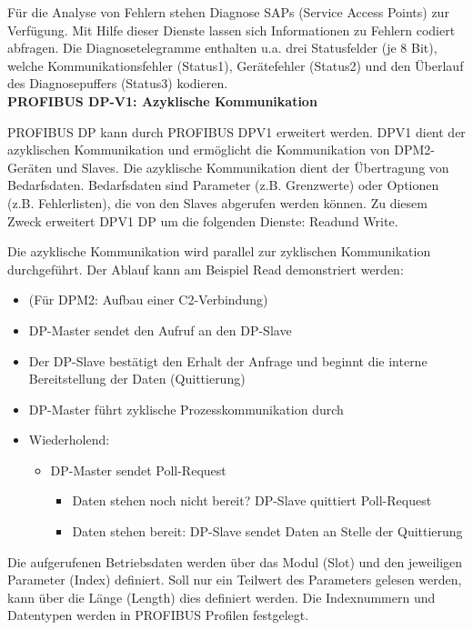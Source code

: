 Für die Analyse von Fehlern stehen Diagnose SAPs (Service Access Points) zur Verfügung. Mit Hilfe dieser Dienste lassen sich Informationen zu Fehlern codiert abfragen. Die Diagnosetelegramme enthalten u.a. drei Statusfelder (je 8 Bit), welche Kommunikationsfehler (Status1), Gerätefehler (Status2) und den Überlauf des Diagnosepuffers (Status3) kodieren\citep{Profibus11}.\\

\textbf{PROFIBUS DP-V1: Azyklische Kommunikation}

PROFIBUS DP kann durch PROFIBUS DPV1 erweitert werden. DPV1 dient der azyklischen Kommunikation und ermöglicht die Kommunikation von DPM2-Geräten und Slaves. Die azyklische Kommunikation dient der Übertragung von Bedarfsdaten. Bedarfsdaten sind Parameter (z.B. Grenzwerte) oder Optionen (z.B. Fehlerlisten), die von den Slaves abgerufen werden können. Zu diesem Zweck erweitert DPV1 DP um die folgenden Dienste: \glqq Read\grqq und \glqq Write\grqq \citep{Profibus6}.


Die azyklische Kommunikation wird parallel zur zyklischen Kommunikation durchgeführt. Der Ablauf kann am Beispiel Read demonstriert werden:
\begin{itemize}
\item (Für DPM2: Aufbau einer C2-Verbindung)
\item DP-Master sendet den Aufruf an den DP-Slave
\item Der DP-Slave bestätigt den Erhalt der Anfrage und beginnt die interne Bereitstellung der Daten (Quittierung)
\item DP-Master führt zyklische Prozesskommunikation durch
\item Wiederholend:
\begin{itemize}
\item DP-Master sendet Poll-Request
\begin{itemize}
\item Daten stehen noch nicht bereit? DP-Slave quittiert Poll-Request
\item Daten stehen bereit: DP-Slave sendet Daten an Stelle der Quittierung
\end{itemize}
\end{itemize}
\end{itemize}

Die aufgerufenen Betriebsdaten werden über das Modul (\glqq Slot\grqq ) und den jeweiligen Parameter (\glqq Index\grqq ) definiert. Soll nur ein Teilwert des Parameters gelesen werden, kann über die Länge (\glqq Length\grqq ) dies definiert werden. Die Indexnummern und Datentypen werden in PROFIBUS Profilen festgelegt\citep{Profibus6}.

